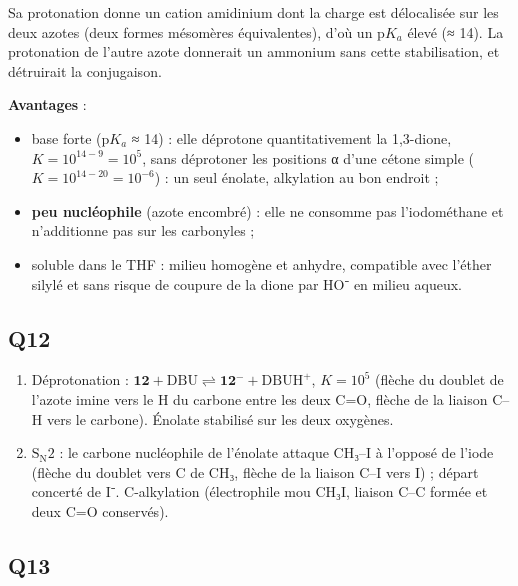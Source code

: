 \documentclass[11pt,a4paper]{article}
\providecommand{\tightlist}{\setlength{\itemsep}{0pt}\setlength{\parskip}{0pt}}
\newcommand{\equationajustee}[1]{%
  \sbox{\boiteequation}{$\displaystyle #1$}%
  \ifdim\wd\boiteequation>\linewidth
    \[\resizebox{\linewidth}{!}{\usebox{\boiteequation}}\]%
  \else
    \[#1\]%
  \fi}
\begin{document}
Sa protonation donne un cation amidinium dont la charge est délocalisée sur les deux azotes (deux formes mésomères équivalentes), d'où un p\(K_a\) élevé (≈ 14). La protonation de l'autre azote donnerait un ammonium sans cette stabilisation, et détruirait la conjugaison.

\textbf{Avantages} :

\begin{itemize}
\tightlist
\item
  base forte (p\(K_a\) ≈ 14) : elle déprotone quantitativement la 1,3-dione, \(K=10^{14-9}=10^5\), sans déprotoner les positions α d'une cétone simple (\(K=10^{14-20}=10^{-6}\)) : un seul énolate, alkylation au bon endroit ;
\item
  \textbf{peu nucléophile} (azote encombré) : elle ne consomme pas l'iodométhane et n'additionne pas sur les carbonyles ;
\item
  soluble dans le THF : milieu homogène et anhydre, compatible avec l'éther silylé et sans risque de coupure de la dione par HO⁻ en milieu aqueux.
\end{itemize}

\hypertarget{q12}{%
\subsection{Q12}\label{q12}}

\begin{enumerate}
\def\labelenumi{\arabic{enumi}.}
\tightlist
\item
  Déprotonation : \(\mathbf{12}+\mathrm{DBU}\rightleftharpoons{\mathbf{12}}^-+\mathrm{DBUH^+}\), \(K=10^5\) (flèche du doublet de l'azote imine vers le H du carbone entre les deux C=O, flèche de la liaison C--H vers le carbone). Énolate stabilisé sur les deux oxygènes.
\item
  \(\mathrm{S_N2}\) : le carbone nucléophile de l'énolate attaque CH₃--I à l'opposé de l'iode (flèche du doublet vers C de CH₃, flèche de la liaison C--I vers I) ; départ concerté de I⁻. C-alkylation (électrophile mou CH₃I, liaison C--C formée et deux C=O conservés).
\end{enumerate}

\equationajustee{\mathbf{12}+\mathrm{CH_3I}+\mathrm{DBU}\longrightarrow\mathbf{13}+\mathrm{DBUH^+}+\mathrm{I^-}}

\hypertarget{q13}{%
\subsection{Q13}\label{q13}}
\end{document}
